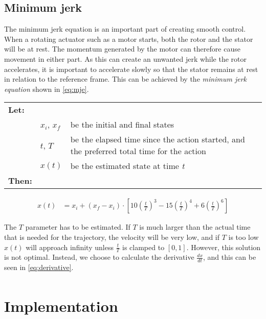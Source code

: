 \documentclass[11pt]{article}
\begin{document}
\subsection{Minimum jerk}
The minimum jerk equation is an important part of creating smooth control. When a rotating actuator such as a motor starts, both the rotor and the stator will be at rest. The momentum generated by the motor can therefore cause movement in either part. As this can create an unwanted jerk while the rotor accelerates, it is important to accelerate slowly so that the stator remains at rest in relation to the reference frame. This can be achieved by the \emph{minimum jerk equation} shown in \vref{eq:mje}.
\par \vspace{10pt}
{\footnotesize
  \begin{tabular}{l l l}
    \textbf{Let:} \\
 &$x_i$, $x_f$ &be the initial and final states\\
 &$t$, $T$ &be the elapsed time since the action started, and the preferred total time for the action  \\
 &$x(t)$ &be the estimated state at time \emph{t} \\
    \textbf{Then:}
  \end{tabular}
  \begin{align}
    x(t) &= x_i +  (x_f - x_i) \cdot \left[10\left(\frac{t}{T}\right)^3 - 15\left(\frac{t}{T}\right)^4 + 6\left(\frac{t}{T}\right)^6 \right]\label{eq:mje}          
  \end{align}}

The $T$ parameter has to be estimated. If $T$ is much larger than  the actual time that is needed for the trajectory, the velocity will be very low, and if $T$ is too low $x(t)$ will approach infinity unless $\frac{t}{T}$ is clamped to $[0,1]$. However, this solution is not optimal. Instead, we choose to calculate the derivative $\frac{dx}{dt}$, and this can be seen in \ref{eq:derivative}.
\begin{align}
\end{align}
\par

\section{Implementation}
\end{document}
